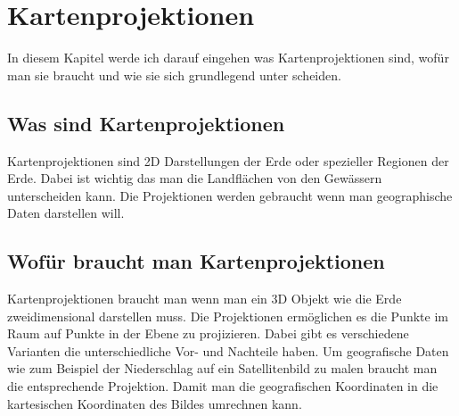 \section{Kartenprojektionen}
In diesem Kapitel werde ich darauf eingehen was Kartenprojektionen sind, wofür man sie braucht und wie sie sich grundlegend unter scheiden.

\subsection{Was sind Kartenprojektionen}
Kartenprojektionen sind 2D Darstellungen der Erde oder spezieller Regionen der Erde. Dabei ist wichtig das man die Landflächen von den Gewässern unterscheiden kann. Die Projektionen werden gebraucht wenn man geographische Daten darstellen will.
\subsection{Wofür braucht man Kartenprojektionen}
Kartenprojektionen braucht man wenn man ein 3D Objekt wie die Erde zweidimensional darstellen muss. Die Projektionen ermöglichen es die Punkte im Raum auf Punkte in der Ebene zu projizieren. Dabei gibt es verschiedene Varianten die unterschiedliche Vor- und Nachteile haben. Um geografische Daten wie zum Beispiel der Niederschlag auf ein Satellitenbild zu malen braucht man die entsprechende Projektion. Damit man die geografischen Koordinaten in die kartesischen Koordinaten des Bildes umrechnen kann. 
